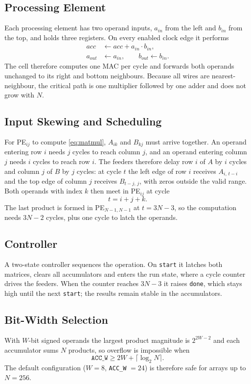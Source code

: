 \documentclass[conference]{IEEEtran}
\begin{document}
\subsection{Processing Element}
Each processing element has two operand inputs, $a_{in}$ from the left and
$b_{in}$ from the top, and holds three registers. On every enabled clock edge
it performs
\begin{align}
acc &\leftarrow acc + a_{in} \cdot b_{in}, \nonumber\\
a_{out} &\leftarrow a_{in}, \qquad b_{out} \leftarrow b_{in}.
\end{align}
The cell therefore computes one MAC per cycle and forwards both operands
unchanged to its right and bottom neighbours. Because all wires are
nearest-neighbour, the critical path is one multiplier followed by one adder
and does not grow with $N$.

\subsection{Input Skewing and Scheduling}
For PE$_{ij}$ to compute \eqref{eq:matmul}, $A_{ik}$ and $B_{kj}$ must arrive
together. An operand entering row $i$ needs $j$ cycles to reach column $j$, and
an operand entering column $j$ needs $i$ cycles to reach row $i$. The feeders
therefore delay row $i$ of $A$ by $i$ cycles and column $j$ of $B$ by $j$
cycles: at cycle $t$ the left edge of row $i$ receives $A_{i,\,t-i}$ and the top
edge of column $j$ receives $B_{t-j,\,j}$, with zeros outside the valid range.
Both operands with index $k$ then meet in PE$_{ij}$ at cycle
\begin{equation}
t = i + j + k .
\end{equation}
The last product is formed in PE$_{N-1,N-1}$ at $t = 3N-3$, so the computation
needs $3N-2$ cycles, plus one cycle to latch the operands.

\subsection{Controller}
A two-state controller sequences the operation. On \texttt{start} it latches
both matrices, clears all accumulators and enters the run state, where a cycle
counter drives the feeders. When the counter reaches $3N-3$ it raises
\texttt{done}, which stays high until the next \texttt{start}; the results
remain stable in the accumulators.

\subsection{Bit-Width Selection}
With $W$-bit signed operands the largest product magnitude is $2^{2W-2}$ and
each accumulator sums $N$ products, so overflow is impossible when
\begin{equation}
\texttt{ACC\_W} \ge 2W + \lceil \log_2 N \rceil .
\end{equation}
The default configuration ($W = 8$, \texttt{ACC\_W} $= 24$) is therefore safe
for arrays up to $N = 256$.
\end{document}
